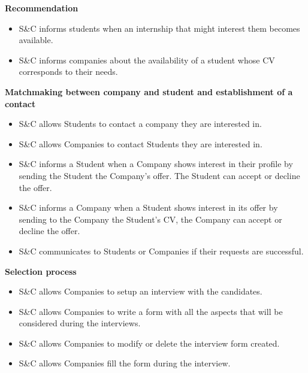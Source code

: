 \textbf{Recommendation}
\begin{itemize}
    \item [\text{[R12]}] S\&C informs students when an internship that might interest them becomes available.

    \item [\text{[R13]}] S\&C informs companies about the availability of a student whose CV corresponds to their needs.
\end{itemize}

\textbf{Matchmaking between company and student and establishment of a contact}
\begin{itemize}
    \item [\text{[R14]}] S\&C allows Students to contact a company they are interested in.
    
    \item [\text{[R15]}] S\&C allows Companies to contact Students they are interested in.

    \item [\text{[R16]}] S\&C informs a Student when a Company shows interest in their profile by sending the Student the Company's offer. The Student can accept or decline the offer.

    \item [\text{[R17]}] S\&C informs a Company when a Student shows interest in its offer by sending to the Company the Student's CV, the Company can accept or decline the offer.

    \item [\text{[R18]}] S\&C communicates to Students or Companies if their requests are successful.
\end{itemize}

\textbf{Selection process}
\begin{itemize}
    \item [\text{[R19]}] S\&C allows Companies to setup an interview with the candidates.

    \item [\text{[R20]}] S\&C allows Companies to write a form with all the aspects that will be considered during the interviews.

    \item [\text{[R21]}] S\&C allows Companies to modify or delete the interview form created.

    \item [\text{[R22]}] S\&C allows Companies fill the form during the interview.
\end{itemize}

